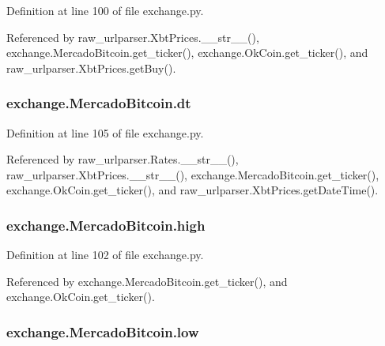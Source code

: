 Definition at line 100 of file exchange.\-py.



Referenced by raw\-\_\-urlparser.\-Xbt\-Prices.\-\_\-\-\_\-str\-\_\-\-\_\-(), exchange.\-Mercado\-Bitcoin.\-get\-\_\-ticker(), exchange.\-Ok\-Coin.\-get\-\_\-ticker(), and raw\-\_\-urlparser.\-Xbt\-Prices.\-get\-Buy().

\hypertarget{classexchange_1_1_mercado_bitcoin_aeee983ba4f72223a11fb914d22902c56}{
\subsubsection[{dt}]{\setlength{\rightskip}{0pt plus 5cm}exchange.\-Mercado\-Bitcoin.\-dt}}\label{classexchange_1_1_mercado_bitcoin_aeee983ba4f72223a11fb914d22902c56}


Definition at line 105 of file exchange.\-py.



Referenced by raw\-\_\-urlparser.\-Rates.\-\_\-\-\_\-str\-\_\-\-\_\-(), raw\-\_\-urlparser.\-Xbt\-Prices.\-\_\-\-\_\-str\-\_\-\-\_\-(), exchange.\-Mercado\-Bitcoin.\-get\-\_\-ticker(), exchange.\-Ok\-Coin.\-get\-\_\-ticker(), and raw\-\_\-urlparser.\-Xbt\-Prices.\-get\-Date\-Time().

\hypertarget{classexchange_1_1_mercado_bitcoin_a0b9c2d465601a48e3b8838354e931c39}{
\subsubsection[{high}]{\setlength{\rightskip}{0pt plus 5cm}exchange.\-Mercado\-Bitcoin.\-high}}\label{classexchange_1_1_mercado_bitcoin_a0b9c2d465601a48e3b8838354e931c39}


Definition at line 102 of file exchange.\-py.



Referenced by exchange.\-Mercado\-Bitcoin.\-get\-\_\-ticker(), and exchange.\-Ok\-Coin.\-get\-\_\-ticker().

\hypertarget{classexchange_1_1_mercado_bitcoin_aaa3aae824bfc5ba3b7dc5252e9554713}{
\subsubsection[{low}]{\setlength{\rightskip}{0pt plus 5cm}exchange.\-Mercado\-Bitcoin.\-low}}\label{classexchange_1_1_mercado_bitcoin_aaa3aae824bfc5ba3b7dc5252e9554713}


